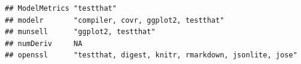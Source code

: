 \documentclass[]{article}
\begin{document}
\begin{verbatim}
## ModelMetrics "testthat"                                                                                                                                                                                                                                                                                                                                                                                                                                                                                                                                                                                
## modelr       "compiler, covr, ggplot2, testthat"                                                                                                                                                                                                                                                                                                                                                                                                                                                                                                                                                       
## munsell      "ggplot2, testthat"                                                                                                                                                                                                                                                                                                                                                                                                                                                                                                                                                                       
## numDeriv     NA                                                                                                                                                                                                                                                                                                                                                                                                                                                                                                                                                                                        
## openssl      "testthat, digest, knitr, rmarkdown, jsonlite, jose"                                                                                                                                                                                                                                                                                                                                                                                                                                                                                                                                      

\end{verbatim}
\end{document}
